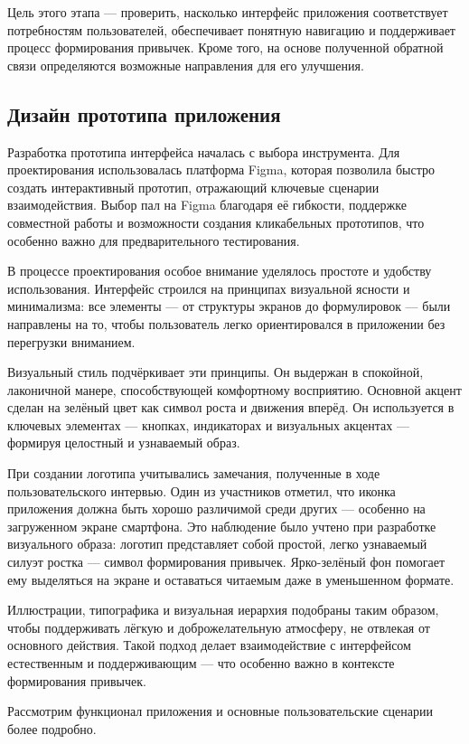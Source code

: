 \documentclass[pdflatex,sn-mathphys-num]{sn-jnl}%
\theoremstyle{thmstyleone}%
\theoremstyle{thmstyletwo}%
\theoremstyle{thmstylethree}%
\begin{document}
Цель этого этапа — проверить, насколько интерфейс приложения соответствует потребностям пользователей, обеспечивает понятную навигацию и поддерживает процесс формирования привычек. Кроме того, на основе полученной обратной связи определяются возможные направления для его улучшения.

\subsection{Дизайн прототипа приложения}

Разработка прототипа интерфейса началась с выбора инструмента. Для проектирования использовалась платформа Figma, которая позволила быстро создать интерактивный прототип, отражающий ключевые сценарии взаимодействия. Выбор пал на Figma благодаря её гибкости, поддержке совместной работы и возможности создания кликабельных прототипов, что особенно важно для предварительного тестирования.

В процессе проектирования особое внимание уделялось простоте и удобству использования. Интерфейс строился на принципах визуальной ясности и минимализма: все элементы — от структуры экранов до формулировок — были направлены на то, чтобы пользователь легко ориентировался в приложении без перегрузки вниманием.

Визуальный стиль подчёркивает эти принципы. Он выдержан в спокойной, лаконичной манере, способствующей комфортному восприятию. Основной акцент сделан на зелёный цвет как символ роста и движения вперёд. Он используется в ключевых элементах — кнопках, индикаторах и визуальных акцентах — формируя целостный и узнаваемый образ.

При создании логотипа учитывались замечания, полученные в ходе пользовательского интервью. Один из участников отметил, что иконка приложения должна быть хорошо различимой среди других — особенно на загруженном экране смартфона. Это наблюдение было учтено при разработке визуального образа: логотип представляет собой простой, легко узнаваемый силуэт ростка — символ формирования привычек. Ярко-зелёный фон помогает ему выделяться на экране и оставаться читаемым даже в уменьшенном формате.

Иллюстрации, типографика и визуальная иерархия подобраны таким образом, чтобы поддерживать лёгкую и доброжелательную атмосферу, не отвлекая от основного действия. Такой подход делает взаимодействие с интерфейсом естественным и поддерживающим — что особенно важно в контексте формирования привычек.

Рассмотрим функционал приложения и основные пользовательские сценарии более подробно.
\end{document}
